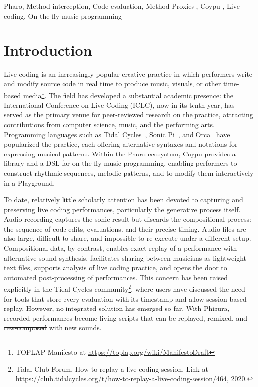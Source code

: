 \documentclass[
]{ceurart}
\providecommand{\DIFadd}[1]{{\protect\color{blue}\uwave{#1}}} %
\providecommand{\DIFdel}[1]{{\protect\color{red}\sout{#1}}} %
\providecommand{\DIFaddbegin}{} %
\providecommand{\DIFaddend}{} %
\providecommand{\DIFdelbegin}{} %
\providecommand{\DIFdelend}{} %
\newcommand{\DIFscaledelfig}{0.5}
\newlength{\DIFdelgraphicswidth} %
\newlength{\DIFdelgraphicsheight} %
\newcommand{\DIFaddincludegraphics}[2][]{{\color{blue}\fbox{\DIFOincludegraphics[#1]{#2}}}} %
\newcommand{\DIFdelincludegraphics}[2][]{%
\sbox{\DIFdelgraphicsbox}{\DIFOincludegraphics[#1]{#2}}%
\settoboxwidth{\DIFdelgraphicswidth}{\DIFdelgraphicsbox} %
\settoboxtotalheight{\DIFdelgraphicsheight}{\DIFdelgraphicsbox} %
\scalebox{\DIFscaledelfig}{%
\parbox[b]{\DIFdelgraphicswidth}{\usebox{\DIFdelgraphicsbox}\\[-\baselineskip] \rule{\DIFdelgraphicswidth}{0em}}\llap{\resizebox{\DIFdelgraphicswidth}{\DIFdelgraphicsheight}{%
\setlength{\unitlength}{\DIFdelgraphicswidth}%
\begin{picture}(1,1)%
\thicklines\linethickness{2pt} %
{\color[rgb]{1,0,0}\put(0,0){\framebox(1,1){}}}%
{\color[rgb]{1,0,0}\put(0,0){\line( 1,1){1}}}%
{\color[rgb]{1,0,0}\put(0,1){\line(1,-1){1}}}%
\end{picture}%
}\hspace*{3pt}}} %
} %
\DeclareRobustCommand{\DIFaddbegin}{\DIFOaddbegin \let\includegraphics\DIFaddincludegraphics} %
\DeclareRobustCommand{\DIFaddend}{\DIFOaddend \let\includegraphics\DIFOincludegraphics} %
\DeclareRobustCommand{\DIFdelbegin}{\DIFOdelbegin \let\includegraphics\DIFdelincludegraphics} %
\DeclareRobustCommand{\DIFdelend}{\DIFOaddend \let\includegraphics\DIFOincludegraphics} %
\begin{document}
\begin{keywords}
  Pharo\sep
  Method interception\sep
  Code evaluation\sep 
  Method Proxies \sep
  Coypu \sep
  Live-coding\sep
  On-the-fly music programming
\end{keywords}

\maketitle



\section{Introduction}\label{sec:intro}
Live coding is an increasingly popular creative practice in which performers write and modify source code in real time to produce music, visuals, or other time-based media\footnote{TOPLAP Manifesto at \url{https://toplap.org/wiki/ManifestoDraft}}.
The field has developed a substantial academic presence: the International Conference on Live Coding (ICLC), now in its tenth year, has served as the primary venue for peer-reviewed research on the practice, attracting contributions from computer science, music, and the performing arts.
Programming languages such as Tidal Cycles~\cite{McLe14a}, Sonic Pi~\cite{Aaro16a}, and Orca~\cite{Mess21a} have popularized the practice, each offering alternative syntaxes and notations for expressing musical patterns. Within the Pharo ecosystem, Coypu\cite{Cipr25c} provides a library and a DSL for on-the-fly music programming, enabling performers to construct rhythmic sequences, melodic patterns, and to modify them interactively in a Playground.

To date, relatively little scholarly attention has been devoted to capturing and preserving live coding performances, particularly the generative process itself. Audio recording captures the sonic result but discards the compositional process: the sequence of code edits, evaluations, and their precise timing. Audio files are also large, difficult to share, and impossible to re-execute under a different setup. Compositional data, by contrast, enables exact replay of a performance with alternative sound synthesis, facilitates sharing between musicians as lightweight text files, supports analysis of live coding practice, and opens the door to automated post-processing of performances. This concern has been raised explicitly in the Tidal Cycles community\footnote{Tidal Club Forum, How to replay a live coding session. Link at \url{https://club.tidalcycles.org/t/how-to-replay-a-live-coding-session/464}, 2020.}, where users have discussed the need for tools that store every evaluation with its timestamp and allow session-based replay. However, no integrated solution has emerged so far. With Phizura, recorded performances become living scripts that can be replayed, remixed, and \DIFdelbegin \DIFdel{rew-composed }\DIFdelend \DIFaddbegin \DIFadd{re-composed }\DIFaddend with new sounds.
\end{document}
